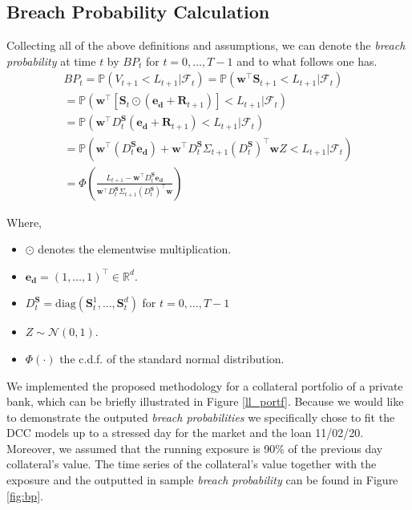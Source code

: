 \documentclass[a4paper, oneside]{discothesis}
\begin{document}
\subsection{Breach Probability Calculation}
Collecting all of the above definitions and assumptions, we can denote the \textit{breach probability} at time $t$ by ${BP}_t$ for $t = 0, \dots, T-1$ and to what follows one has.
\begin{equation}\label{BP}
    \begin{split}
{BP}_{t} = \mathbb{P}\left(V_{t+1}<L_{t+1}|\mathcal{F}_t\right) = \mathbb{P}\left(\mathbf{w}^\intercal \mathbf{S}_{t+1}<L_{t+1}|\mathcal{F}_t \right)\\
=\mathbb{P}\left(\mathbf{w}^\intercal\left[\mathbf{S}_t \odot\left(\mathbf{e_d}+\mathbf{R}_{t+1}\right)\right]<L_{t+1}|\mathcal{F}_t\right)  \\
=\mathbb{P}\left(\mathbf{w}^\intercal D^\mathbf{S}_t\left(\mathbf{e_d}+\mathbf{R}_{t+1}\right)<L_{t+1}| \mathcal{F}_t\right)\\
=\mathbb{P}\left(\mathbf{w}^\intercal\left( D^\mathbf{S}_t\mathbf{e_d}\right)+\mathbf{w}^\intercal D^\mathbf{S}_t\Sigma_{t+1} (D^\mathbf{S}_t)^\intercal \mathbf{w} Z<L_{t+1}| \mathcal{F}_t\right)\\
=\Phi\left(\frac{L_{t+1}-\mathbf{w}^\intercal D^\mathbf{S}_t\mathbf{e_d}}{\mathbf{w}^\intercal D^\mathbf{S}_t\Sigma_{t+1} (D^\mathbf{S}_t)^\intercal \mathbf{w}}\right)
    \end{split}
\end{equation}

Where, 
\begin{itemize}
    \item $\odot$ denotes the elementwise multiplication.
    \item $\mathbf{e_d} = (1, \dots, 1)^\intercal\in\mathbb{R}^d$.
    \item $D^\mathbf{S}_t = \text{diag}\left(\mathbf{S}_t^1, \dots, \mathbf{S}_t^d\right)$ for $t = 0, \dots, T-1$
    \item $Z\sim\mathcal{N}(0,1)$.
    \item $\Phi(\cdot)$ the c.d.f. of the standard normal distribution.
\end{itemize}

We implemented the proposed methodology for a collateral portfolio of a private bank, which can be briefly illustrated in Figure \ref{ll_portf}. Because we would like to demonstrate the outputed \textit{breach probabilities} we specifically chose to fit the DCC models up to a stressed day for the market and the loan 11/02/20. Moreover, we assumed that the running exposure is 90\% of the previous day collateral's value. The time series of the collateral's value together with the exposure and the outputted in sample \textit{breach probability} can be found in Figure  \ref{fig:bp}.
\end{document}
